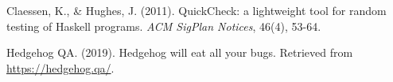 \documentclass{scrartcl}
\begin{document}


\begin{thebibliography}{99}

Claessen, K., \& Hughes, J. (2011). QuickCheck: a lightweight tool for random
testing of Haskell programs. \textit{ACM SigPlan Notices}, 46(4), 53-64.

Hedgehog QA. (2019). Hedgehog will eat all your bugs. Retrieved from
\url{https://hedgehog.qa/}.

\end{thebibliography}
\end{document}
